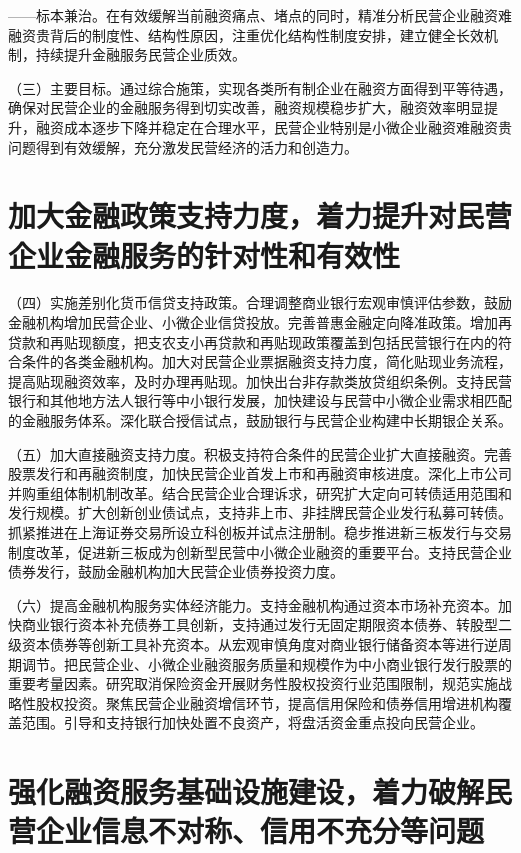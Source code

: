 ——标本兼治。在有效缓解当前融资痛点、堵点的同时，精准分析民营企业融资难融资贵背后的制度性、结构性原因，注重优化结构性制度安排，建立健全长效机制，持续提升金融服务民营企业质效。

（三）主要目标。通过综合施策，实现各类所有制企业在融资方面得到平等待遇，确保对民营企业的金融服务得到切实改善，融资规模稳步扩大，融资效率明显提升，融资成本逐步下降并稳定在合理水平，民营企业特别是小微企业融资难融资贵问题得到有效缓解，充分激发民营经济的活力和创造力。

\section{加大金融政策支持力度，着力提升对民营企业金融服务的针对性和有效性}

（四）实施差别化货币信贷支持政策。合理调整商业银行宏观审慎评估参数，鼓励金融机构增加民营企业、小微企业信贷投放。完善普惠金融定向降准政策。增加再贷款和再贴现额度，把支农支小再贷款和再贴现政策覆盖到包括民营银行在内的符合条件的各类金融机构。加大对民营企业票据融资支持力度，简化贴现业务流程，提高贴现融资效率，及时办理再贴现。加快出台非存款类放贷组织条例。支持民营银行和其他地方法人银行等中小银行发展，加快建设与民营中小微企业需求相匹配的金融服务体系。深化联合授信试点，鼓励银行与民营企业构建中长期银企关系。

（五）加大直接融资支持力度。积极支持符合条件的民营企业扩大直接融资。完善股票发行和再融资制度，加快民营企业首发上市和再融资审核进度。深化上市公司并购重组体制机制改革。结合民营企业合理诉求，研究扩大定向可转债适用范围和发行规模。扩大创新创业债试点，支持非上市、非挂牌民营企业发行私募可转债。抓紧推进在上海证券交易所设立科创板并试点注册制。稳步推进新三板发行与交易制度改革，促进新三板成为创新型民营中小微企业融资的重要平台。支持民营企业债券发行，鼓励金融机构加大民营企业债券投资力度。

（六）提高金融机构服务实体经济能力。支持金融机构通过资本市场补充资本。加快商业银行资本补充债券工具创新，支持通过发行无固定期限资本债券、转股型二级资本债券等创新工具补充资本。从宏观审慎角度对商业银行储备资本等进行逆周期调节。把民营企业、小微企业融资服务质量和规模作为中小商业银行发行股票的重要考量因素。研究取消保险资金开展财务性股权投资行业范围限制，规范实施战略性股权投资。聚焦民营企业融资增信环节，提高信用保险和债券信用增进机构覆盖范围。引导和支持银行加快处置不良资产，将盘活资金重点投向民营企业。

\section{强化融资服务基础设施建设，着力破解民营企业信息不对称、信用不充分等问题}

